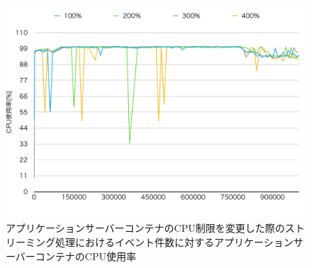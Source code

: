 \documentclass[../../../../../main]{subfiles}
\begin{document}
    \begin{figure}[H]
        \centering
        \includegraphics[width=12cm]{graph}
        \caption{アプリケーションサーバーコンテナのCPU制限を変更した際のストリーミング処理におけるイベント件数に対するアプリケーションサーバーコンテナのCPU使用率}
        \label{fig:stream-change-app-cpu-limit-app-cpu-app_1024-db_1_1024}
    \end{figure}
\end{document}
